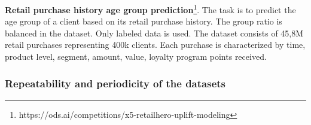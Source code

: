 \documentclass[sigconf]{acmart}
\begin{document}
\textbf{Retail purchase history age group prediction}\footnote{https://ods.ai/competitions/x5-retailhero-uplift-modeling}. The task is to predict the age group of a client based on its retail purchase history. The group ratio is balanced in the dataset. Only labeled data is used. The dataset consists of 45,8M retail purchases representing 400k clients. Each purchase is characterized by time, product level, segment, amount, value, loyalty program points received.


\subsubsection{Repeatability and periodicity of the datasets} \label{sec-period}
\end{document}
